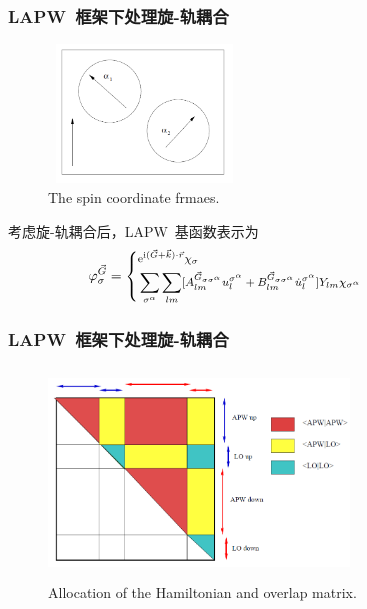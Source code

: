 \documentclass[cjk,slidestop,compress,mathserif,blue]{beamer}
\begin{document}
\frame
{
	\frametitle{\textrm{LAPW~}框架下处理旋-轨耦合}
\begin{figure}[h!]
\centering
\vspace*{-0.10in}
\includegraphics[height=1.45in,width=2.01in,viewport=0 10 430 330,clip]{Figures/WIENNCM_Sphere.png}
\caption{\small \textrm{The spin coordinate frmaes.}}%
\label{WIENNCM_sphere}
\end{figure}
考虑旋-轨耦合后，\textrm{LAPW~}基函数表示为
\begin{displaymath}
	\footnotesize\hskip -50pt \varphi^{\vec G}_{\sigma}=\left\{
  \begin{aligned}
	  &\mathrm{e}^{\mathrm{i}(\vec G+\vec k)\cdot\vec r}\chi_{\sigma}\\
	  &\sum_{\sigma^{\alpha}}\sum_{lm}[A^{\vec G_{\sigma\sigma^{\alpha}}}_{lm}u_l^{\sigma^{\alpha}}+B^{\vec G_{\sigma\sigma^{\alpha}}}_{lm}\dot u_l^{\sigma^{\alpha}}]Y_{lm}\chi_{\sigma^{\alpha}}
  \end{aligned}
\right.
\end{displaymath}
}

\frame
{
	\frametitle{\textrm{LAPW~}框架下处理旋-轨耦合}
\begin{figure}[h!]
\centering
\vspace*{-0.10in}
\includegraphics[height=2.19in,width=3.15in,viewport=0 0 650 430,clip]{Figures/WIENNCM_Ham.png}
\caption{\small \textrm{Allocation of the Hamiltonian and overlap matrix.}}%
\label{WIENNCM_Ham}
\end{figure}
}
\end{document}
